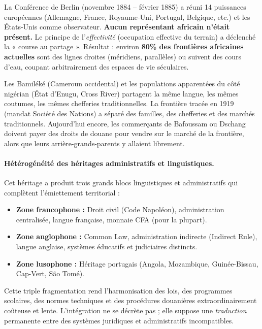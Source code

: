 \documentclass[11pt]{article}
\begin{document}
\begin{savaistu}
La Conférence de Berlin (novembre 1884 – février 1885) a réuni 14 puissances européennes (Allemagne, France, Royaume-Uni, Portugal, Belgique, etc.) et les États-Unis comme observateur. \textbf{Aucun représentant africain n'était présent.} Le principe de l'\emph{effectivité} (occupation effective du terrain) a déclenché la « course au partage ». Résultat : environ \textbf{80\% des frontières africaines actuelles} sont des lignes droites (méridiens, parallèles) ou suivent des cours d'eau, coupant arbitrairement des espaces de vie séculaires.
\end{savaistu}

\begin{exemplebox}
Les Bamiléké (Cameroun occidental) et les populations apparentées du côté nigérian (État d'Enugu, Cross River) partagent la même langue, les mêmes coutumes, les mêmes chefferies traditionnelles. La frontière tracée en 1919 (mandat Société des Nations) a séparé des familles, des chefferies et des marchés traditionnels. Aujourd'hui encore, les commerçants de Bafoussam ou Dschang doivent payer des droits de douane pour vendre sur le marché de la frontière, alors que leurs arrière-grands-parents y allaient librement.
\end{exemplebox}

\paragraph{Hétérogénéité des héritages administratifs et linguistiques.}
Cet héritage a produit trois grands blocs linguistiques et administratifs qui complètent l'émiettement territorial :
\begin{itemize}
    \item \textbf{Zone francophone :} Droit civil (Code Napoléon), administration centralisée, langue française, monnaie CFA (pour la plupart).
    \item \textbf{Zone anglophone :} Common Law, administration indirecte (Indirect Rule), langue anglaise, systèmes éducatifs et judiciaires distincts.
    \item \textbf{Zone lusophone :} Héritage portugais (Angola, Mozambique, Guinée-Bissau, Cap-Vert, São Tomé).
\end{itemize}
Cette triple fragmentation rend l'harmonisation des lois, des programmes scolaires, des normes techniques et des procédures douanières extraordinairement coûteuse et lente. L'intégration ne se décrète pas ; elle suppose une \emph{traduction} permanente entre des systèmes juridiques et administratifs incompatibles.
\end{document}
